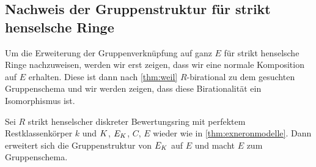 \subsection{Nachweis der Gruppenstruktur für strikt henselsche Ringe}
Um die Erweiterung der Gruppenverknüpfung auf ganz $E$ für strikt
henselsche Ringe nachzuweisen, werden wir erst zeigen, dass wir eine
normale Komposition auf $E$ erhalten.
Diese ist dann nach \ref{thm:weil} $R$-birational zu dem gesuchten
Gruppenschema und wir werden zeigen, dass diese Birationalität ein
Isomorphismus ist.
\begin{Satz}\label{thm:egruppenschema}
  Sei $R$ strikt henselscher diskreter Bewertungsring mit perfektem
  Restklassenkörper $k$ und $K$, $E_{K}$, $C$, $E$ wieder wie in
  \ref{thm:exneronmodelle}.
  Dann erweitert sich die Gruppenstruktur von $E_{K}$ auf $E$ und macht
  $E$ zum Gruppenschema.
\end{Satz}
